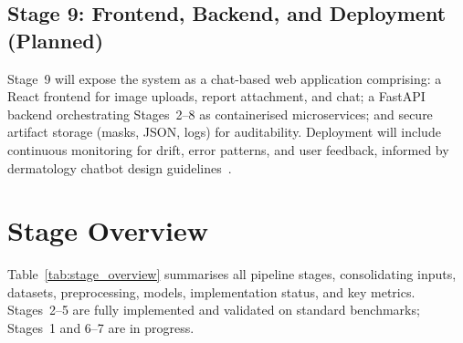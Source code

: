 \documentclass[conference]{IEEEtran}
\begin{document}
\subsection{Stage 9: Frontend, Backend, and Deployment (Planned)}

Stage~9 will expose the system as a chat-based web application
comprising: a React frontend for image uploads, report attachment, and
chat; a FastAPI backend orchestrating Stages~2--8 as containerised
microservices; and secure artifact storage (masks, JSON, logs) for
auditability. Deployment will include continuous monitoring for drift,
error patterns, and user feedback, informed by dermatology chatbot
design
guidelines~\cite{dermatologychatbot2024,casestudy2024_wizard_of_oz,
amie2025,convagents2025_effectiveness}.

\section{Stage Overview}
\label{sec:stage_overview}

Table~\ref{tab:stage_overview} summarises all pipeline stages,
consolidating inputs, datasets, preprocessing, models, implementation
status, and key metrics. Stages~2--5 are fully implemented and
validated on standard benchmarks; Stages~1 and 6--7 are in progress.
\end{document}
